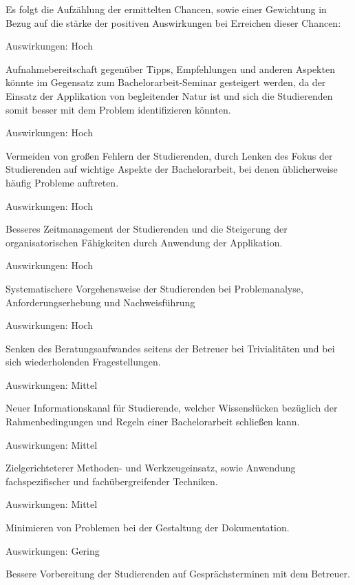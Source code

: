 \documentclass[bibliography=totoc,listof=totoc,BCOR=5mm,DIV=12,oneside]{scrbook}
\begin{document}
\par \bigskip Es folgt die Aufzählung der ermittelten Chancen, sowie einer Gewichtung in Bezug auf die stärke der positiven Auswirkungen bei Erreichen dieser Chancen:

\begin{enumerate} [label=\textit{[C\arabic*]}]
\item 
\par Auswirkungen: Hoch
\par Aufnahmebereitschaft gegenüber Tipps, Empfehlungen und anderen Aspekten könnte im Gegensatz zum Bachelorarbeit-Seminar gesteigert werden, da der Einsatz der Applikation von begleitender Natur ist und sich die Studierenden somit besser mit dem Problem identifizieren könnten.
\item
\par Auswirkungen: Hoch
\par Vermeiden von großen Fehlern der Studierenden, durch Lenken des Fokus der Studierenden auf wichtige Aspekte der Bachelorarbeit, bei denen üblicherweise häufig Probleme auftreten.
\item
\par Auswirkungen: Hoch
\par Besseres Zeitmanagement der Studierenden und die Steigerung der organisatorischen Fähigkeiten durch Anwendung der Applikation.
\item
\par Auswirkungen: Hoch
\par Systematischere Vorgehensweise der Studierenden bei Problemanalyse, Anforderungserhebung und Nachweisführung
\item
\par Auswirkungen: Hoch
\par Senken des Beratungsaufwandes seitens der Betreuer bei Trivialitäten und bei sich wiederholenden Fragestellungen.
\item 
\par Auswirkungen: Mittel
\par Neuer Informationskanal für Studierende, welcher Wissenslücken bezüglich der Rahmenbedingungen und Regeln einer Bachelorarbeit schließen kann.
\item
\par Auswirkungen: Mittel
\par Zielgerichteterer Methoden- und Werkzeugeinsatz, sowie Anwendung fachspezifischer und fachübergreifender Techniken.
\item
\par Auswirkungen: Mittel
\par Minimieren von Problemen bei der Gestaltung der Dokumentation.
\item
\par Auswirkungen: Gering
\par Bessere Vorbereitung der Studierenden auf Gesprächsterminen mit dem Betreuer.
\end{enumerate}
\end{document}

